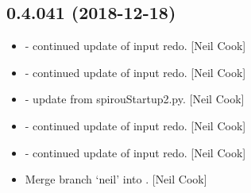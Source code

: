 \documentclass[a4paper,10pt,english]{report}
\begin{document}
\subsection{0.4.041 (2018-12-18)}
\label{\detokenize{misc/changelog:id226}}\begin{itemize}
\item {} 
 - continued update of input redo. {[}Neil Cook{]}

\item {} 
 - continued update of input redo. {[}Neil Cook{]}

\item {} 
 - update from spirouStartup2.py. {[}Neil Cook{]}

\item {} 
 - continued update of input redo. {[}Neil Cook{]}

\item {} 
 - continued update of input redo. {[}Neil Cook{]}

\item {} 
Merge branch ‘neil’ into . {[}Neil Cook{]}

\end{itemize}
\end{document}
